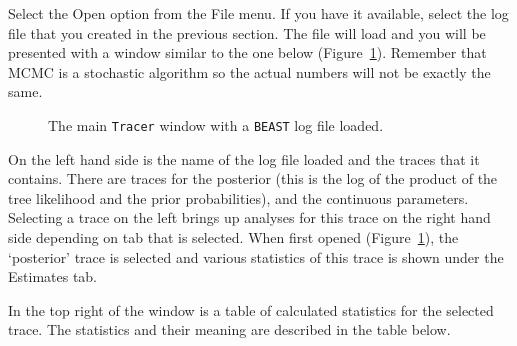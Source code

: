 \documentclass[cup7b, english]{cupbook}
\begin{document}
Select the Open option from the File menu. If you have it available, select the log file
that you created in the previous section. The file will load and you will be
presented with a window similar to the one below (Figure~\ref{fig:figure5}). Remember that MCMC is a stochastic
algorithm so the actual numbers will not be exactly the same.

\begin{figure}[htbp]
\begin{center}
\leavevmode
{}
\end{center}
\caption{The main \texttt{Tracer} window with a \texttt{BEAST} log file loaded.}
\label{fig:figure5}
\end{figure}

On the left hand side is the name of the log file loaded and the traces that it contains.
There are traces for the posterior (this is the log of the product of the tree likelihood and
the prior probabilities), and the continuous parameters. Selecting a trace on the left
brings up analyses for this trace on the right hand side depending on tab that is
selected. When first opened (Figure~\ref{fig:figure5}), the `posterior' trace is selected and various statistics
of this trace is shown under the Estimates tab.

In the top right of the window is a table of calculated statistics for the selected trace.
The statistics and their meaning are described in the table below.
\end{document}
